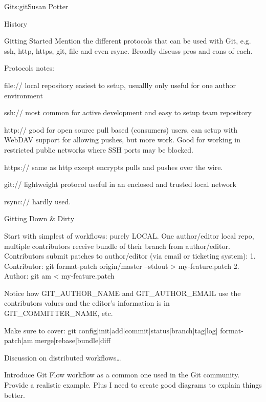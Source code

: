 \begin{aosachapter}{Git}{s:git}{Susan Potter}
\begin{aosasect1}{History}
\begin{aosasect1}{Gitting Started}
Mention the different protocols that can be used with Git, e.g. ssh, http, 
https, git, file and even rsync. Broadly discuss pros and cons of each.

Protocols notes: 
\begin{aosaitemize}
  \item file:// local repository easiest to setup, usuallly only useful for
    one author environment
  \item ssh:// most common for active development and easy to setup team repository
  \item http:// good for open source pull based (consumers) users, can setup with 
    WebDAV support for allowing pushes, but more work. Good for working in
    restricted public networks where SSH ports may be blocked.
  \item https:// same as http except encrypts pulls and pushes over the wire.
  \item git:// lightweight protocol useful in an enclosed and trusted local network
  \item rsync:// hardly used.
\end{aosaitemize}

\end{aosasect1}

\begin{aosasect1}{Gitting Down \& Dirty}

Start with simplest of workflows: purely LOCAL. One author/editor local repo,
multiple contributors receive bundle of their branch from author/editor.
Contributors submit patches to author/editor (via email or ticketing system):
1. Contributor: git format-patch origin/master --stdout > my-feature.patch
2. Author: git am < my-feature.patch

Notice how GIT\_AUTHOR\_NAME and GIT\_AUTHOR\_EMAIL use the contributors
values and the editor's information is in GIT\_COMMITTER\_NAME, etc.

Make sure to cover: git config|init|add|commit|status|branch|tag|log|
format-patch|am|merge|rebase|bundle|diff


Discussion on distributed workflows\ldots

Introduce Git Flow workflow as a common one used in the Git community. Provide
a realistic example. Plus I need to create good diagrams to explain things
better.


\end{aosasect1}
\end{aosasect1}
\end{aosachapter}
